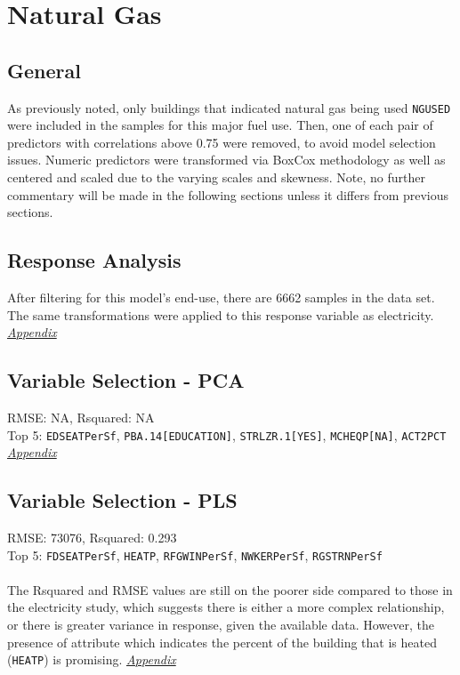 \section*{Natural Gas}
\label{sec:natural_gas}

\subsection{General}
As previously noted, only buildings that indicated natural gas being used \lstinline{NGUSED} were included in the samples for this major fuel use.  Then, one of each pair of predictors with correlations above 0.75 were removed, to avoid model selection issues. Numeric predictors were transformed via BoxCox methodology as well as centered and scaled due to the varying scales and skewness.  Note, no further commentary will be made in the following sections unless it differs from previous sections.

\subsection{Response Analysis}

After filtering for this model's end-use, there are 6662 samples in the data set.  The same transformations were applied to this response variable as electricity. \textit{\hyperref[appendix:natural_gas:response]{Appendix}}

\subsection{Variable Selection - PCA}
RMSE: NA, Rsquared: NA\\
Top 5: \lstinline{EDSEATPerSf}, \lstinline{PBA.14[EDUCATION]}, \lstinline{STRLZR.1[YES]}, \lstinline{MCHEQP[NA]}, \lstinline{ACT2PCT}  \textit{\hyperref[appendix:natural_gas:pca]{Appendix}}

\subsection{Variable Selection - PLS}
RMSE: 73076, Rsquared: 0.293\\
Top 5: \lstinline{FDSEATPerSf}, \lstinline{HEATP}, \lstinline{RFGWINPerSf}, \lstinline{NWKERPerSf}, \lstinline{RGSTRNPerSf}\\
\\[0.1in]
The Rsquared and RMSE values are still on the poorer side compared to those in the electricity study, which suggests there is either a more complex relationship, or there is greater variance in response, given the available data. However, the presence of attribute which indicates the percent of the building that is heated (\lstinline{HEATP}) is promising.   \textit{\hyperref[appendix:natural_gas:pls]{Appendix}}

